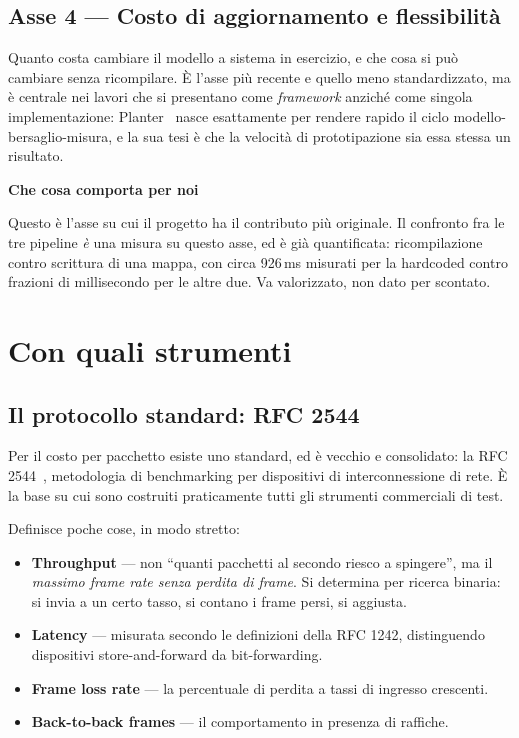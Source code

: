 \documentclass[11pt,a4paper,oneside]{report}
\newcommand{\metrica}[1]{\textcolor{accent}{\textbf{#1}}}
\newcommand{\verdetto}[2]{%
  \par\vspace{4pt}%
  \noindent\colorbox{boxbg}{%
    \begin{minipage}{\dimexpr\linewidth-2\fboxsep}%
      \vspace{3pt}\textbf{\color{accent}#1}\par\vspace{2pt}#2\vspace{3pt}%
    \end{minipage}}%
  \par\vspace{6pt}}
\begin{document}
\section{Asse 4 --- Costo di aggiornamento e flessibilità}

Quanto costa cambiare il modello a sistema in esercizio, e che cosa si
può cambiare senza ricompilare. È l'asse più recente e quello meno
standardizzato, ma è centrale nei lavori che si presentano come
\emph{framework} anziché come singola implementazione:
Planter~\cite{zheng24planter} nasce esattamente per rendere rapido il
ciclo modello-bersaglio-misura, e la sua tesi è che la velocità di
prototipazione sia essa stessa un risultato.

\verdetto{Che cosa comporta per noi}{Questo è l'asse su cui il
progetto ha il contributo più originale. Il confronto fra le tre
pipeline \emph{è} una misura su questo asse, ed è già quantificata:
ricompilazione contro scrittura di una mappa, con circa 926\,ms
misurati per la hardcoded contro frazioni di millisecondo per le altre
due. Va valorizzato, non dato per scontato.}

\chapter{Con quali strumenti}
\label{ch:come}

\section{Il protocollo standard: RFC 2544}

Per il costo per pacchetto esiste uno standard, ed è vecchio e
consolidato: la RFC 2544~\cite{rfc2544}, metodologia di benchmarking
per dispositivi di interconnessione di rete. È la base su cui sono
costruiti praticamente tutti gli strumenti commerciali di test.

Definisce poche cose, in modo stretto:

\begin{itemize}
  \item \metrica{Throughput} --- non ``quanti pacchetti al secondo
  riesco a spingere'', ma il \emph{massimo frame rate senza perdita di
  frame}. Si determina per ricerca binaria: si invia a un certo tasso,
  si contano i frame persi, si aggiusta.
  \item \metrica{Latency} --- misurata secondo le definizioni della
  RFC 1242, distinguendo dispositivi store-and-forward da bit-forwarding.
  \item \metrica{Frame loss rate} --- la percentuale di perdita a tassi
  di ingresso crescenti.
  \item \metrica{Back-to-back frames} --- il comportamento in presenza
  di raffiche.
\end{itemize}
\end{document}
